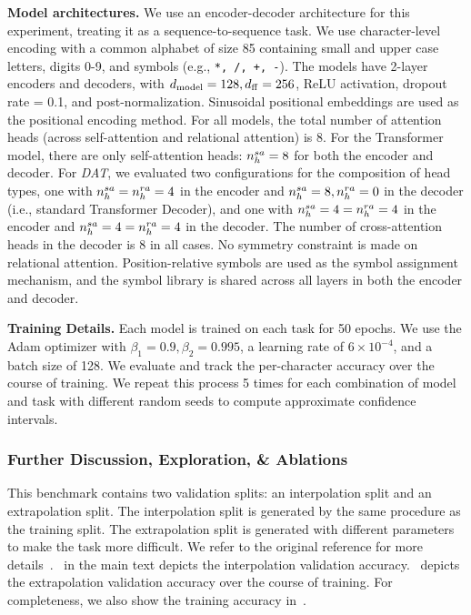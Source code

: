 \textbf{Model architectures.} We use an encoder-decoder architecture for this experiment, treating it as a sequence-to-sequence task. We use character-level encoding with a common alphabet of size 85 containing small and upper case letters, digits 0-9, and symbols (e.g., \texttt{*, /, +, -}). The models have 2-layer encoders and decoders, with $d_{\mathrm{model}} = 128, d_{\mathrm{ff}} = 256$, ReLU activation, dropout rate = 0.1, and post-normalization. Sinusoidal positional embeddings are used as the positional encoding method. For all models, the total number of attention heads (across self-attention and relational attention) is $8$. For the Transformer model, there are only self-attention heads: $n_h^{sa} = 8$ for both the encoder and decoder. For \textit{DAT}, we evaluated two configurations for the composition of head types, one with $n_h^{sa} = n_h^{ra} = 4$ in the encoder and $n_h^{sa} = 8, n_h^{ra} = 0$ in the decoder (i.e., standard Transformer Decoder), and one with $n_h^{sa} = 4 = n_h^{ra} = 4$ in the encoder and $n_h^{sa} = 4 = n_h^{ra} = 4$ in the decoder. The number of cross-attention heads in the decoder is $8$ in all cases. No symmetry constraint is made on relational attention. Position-relative symbols are used as the symbol assignment mechanism, and the symbol library is shared across all layers in both the encoder and decoder.

\textbf{Training Details.} Each model is trained on each task for 50 epochs. We use the Adam optimizer with $\beta_1 = 0.9, \beta_2 = 0.995$, a learning rate of $6 \times 10^{-4}$, and a batch size of 128. We evaluate and track the per-character accuracy over the course of training. We repeat this process 5 times for each combination of model and task with different random seeds to compute approximate confidence intervals.

\subsubsection*{Further Discussion, Exploration, \& Ablations}

This benchmark contains two validation splits: an interpolation split and an extrapolation split. The interpolation split is generated by the same procedure as the training split. The extrapolation split is generated with different parameters to make the task more difficult. We refer to the original reference for more details~\citep{saxtonAnalyzingMathematicalReasoning2019}.~ in the main text depicts the interpolation validation accuracy.~ depicts the extrapolation validation accuracy over the course of training. For completeness, we also show the training accuracy in~.

